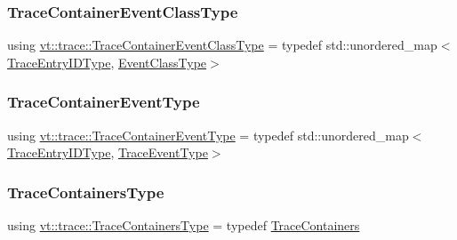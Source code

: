 \subsubsection{\texorpdfstring{Trace\+Container\+Event\+Class\+Type}{TraceContainerEventClassType}}
{\footnotesize\ttfamily using \hyperlink{namespacevt_1_1trace_a352c8799ee88afa3f1b7008952ed8485}{vt\+::trace\+::\+Trace\+Container\+Event\+Class\+Type} = typedef std\+::unordered\+\_\+map$<$\hyperlink{namespacevt_1_1trace_a3c14050715ba9eceaeff51fb3de64f2f}{Trace\+Entry\+I\+D\+Type}, \hyperlink{namespacevt_1_1trace_afc5456ac95b0d3e9bb63a21597f5660c}{Event\+Class\+Type}$>$}

\mbox{\label{namespacevt_1_1trace_a80118aaa48fed940af3899800bba2303}} 
\subsubsection{\texorpdfstring{Trace\+Container\+Event\+Type}{TraceContainerEventType}}
{\footnotesize\ttfamily using \hyperlink{namespacevt_1_1trace_a80118aaa48fed940af3899800bba2303}{vt\+::trace\+::\+Trace\+Container\+Event\+Type} = typedef std\+::unordered\+\_\+map$<$\hyperlink{namespacevt_1_1trace_a3c14050715ba9eceaeff51fb3de64f2f}{Trace\+Entry\+I\+D\+Type}, \hyperlink{namespacevt_1_1trace_a79b7fa947245c08d04a3ea67fbff2c30}{Trace\+Event\+Type}$>$}

\mbox{\label{namespacevt_1_1trace_a526573625774f28d49baddd61b9c701c}} 
\subsubsection{\texorpdfstring{Trace\+Containers\+Type}{TraceContainersType}}
{\footnotesize\ttfamily using \hyperlink{namespacevt_1_1trace_a526573625774f28d49baddd61b9c701c}{vt\+::trace\+::\+Trace\+Containers\+Type} = typedef \hyperlink{classvt_1_1trace_1_1_trace_containers}{Trace\+Containers}}

\mbox{\label{namespacevt_1_1trace_a3c14050715ba9eceaeff51fb3de64f2f}} 
